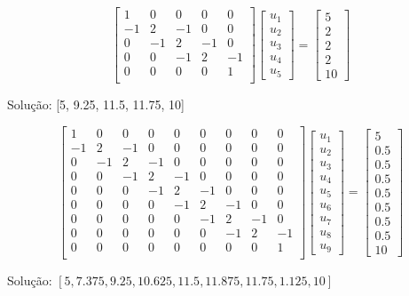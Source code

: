 \begin{resp}
 $$\left[
  \begin{array}{ccccc}
         1 & 0& 0& 0& 0\\
         -1 & 2 & -1 &0&0\\
         0&-1 & 2 & -1 &0\\
         0&0&-1 & 2 & -1 \\
         0 & 0& 0& 0& 1\\
        \end{array}
\right]
\left[
  \begin{array}{c}
     u_1\\ u_2\\u_3\\u_4 \\ u_5
   \end{array}
\right]
=
\left[
  \begin{array}{c}
     5\\ 2\\2\\2 \\ 10
   \end{array}
\right]
$$


Solução:  [5, 9.25, 11.5, 11.75, 10]    

$$\left[
  \begin{array}{ccccccccc}
         1 & 0& 0& 0& 0& 0& 0& 0& 0\\
         -1 & 2 & -1 &0&0& 0& 0& 0& 0\\
         0&-1 & 2 & -1 &0& 0& 0& 0& 0\\
         0&0&-1 & 2 & -1 & 0& 0& 0& 0\\
         0&0&0&-1 & 2 & -1 & 0& 0& 0\\
         0&0&0&0&-1 & 2 & -1 & 0& 0\\
         0&0&0&0&0&-1 & 2 & -1 & 0\\
         0&0&0&0&0&0&-1 & 2 & -1\\
         0 & 0& 0& 0& 0& 0& 0& 0& 1\\
        \end{array}
\right]
\left[
  \begin{array}{c}
     u_1\\ u_2\\u_3\\u_4 \\u_5\\ u_6\\u_7\\u_8\\u_9
   \end{array}
\right]
=
\left[
  \begin{array}{c}
     5\\ 0.5\\0.5\\0.5\\ 0.5\\0.5\\0.5\\0.5 \\ 10
   \end{array}
\right]
$$

Solução:  $[5, 7.375, 9.25, 10.625, 11.5, 11.875, 11.75, 1.125, 10]$
\end{resp}



